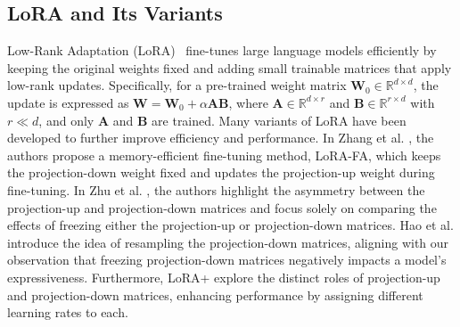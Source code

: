 \documentclass{article}
\theoremstyle{plain}
\theoremstyle{definition}
\theoremstyle{remark}
\begin{document}
\subsection{LoRA and Its Variants} \label{lora-federated}
\vspace{-0.3cm}
Low-Rank Adaptation (LoRA)~\cite{hu2021lora} fine-tunes large language models efficiently by keeping the original weights fixed and adding small trainable matrices that apply low-rank updates. Specifically, for a pre-trained weight matrix $\mathbf{W}_0 \in \mathbb{R}^{d\times d}$, the update is expressed as $\mathbf{W} = \mathbf{W}_0 + \alpha \mathbf{A}\mathbf{B}$, where $\mathbf{A} \in \mathbb{R}^{d \times r}$ and $\mathbf{B} \in \mathbb{R}^{r \times d}$ with $r \ll d$, and only $\mathbf{A}$ and $\mathbf{B}$ are trained. Many variants of LoRA have been developed to further improve efficiency and performance. In Zhang et al. \cite{zhang2023lorafa}, the authors propose a memory-efficient fine-tuning method, LoRA-FA, which keeps the projection-down weight fixed and updates the projection-up weight during fine-tuning. In Zhu et al. \cite{zhu2024asymmetrylowrankadaptersfoundation}, the authors highlight the asymmetry between the projection-up and projection-down matrices and focus solely on comparing the effects of freezing either the projection-up or projection-down matrices. Hao et al. \cite{hao2024floralowrankadapterssecretly} introduce the idea of resampling the projection-down matrices, aligning with our observation that freezing projection-down matrices negatively impacts a model's expressiveness. Furthermore, LoRA+ \cite{hayou2024lora} explore the distinct roles of projection-up and projection-down matrices, enhancing performance by assigning different learning rates to each. 
\vspace{-0.3cm}
\end{document}
